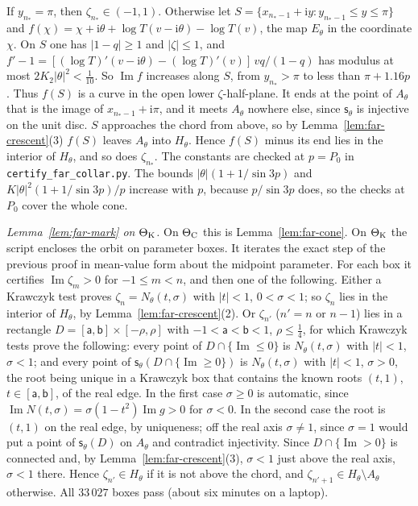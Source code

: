 \documentclass[11pt]{amsart}
\theoremstyle{definition}
\newcommand{\ii}{\mathrm{i}}
\begin{document}
If $y_{n_*}=\pi$, then $\zeta_{n_*}\in(-1,1)$.  Otherwise let
$S=\{x_{n_*-1}+\ii y:y_{n_*-1}\le y\le\pi\}$ and $f(\chi)=\chi+\ii\theta+\log T(v-\ii\theta)-\log T(v)$, the
map $E_\theta$ in the coordinate $\chi$.  On $S$ one has $|1-q|\ge1$ and $|\zeta|\le1$, and
$f'-1=[(\log T)'(v-\ii\theta)-(\log T)'(v)]\,vq/(1-q)$ has modulus at most $2K_2|\theta|^2<\tfrac1{10}$.  So
$\operatorname{Im}f$ increases along $S$, from $y_{n_*}>\pi$ to less than $\pi+1.16p$.  Thus $f(S)$ is a
curve in the open lower $\zeta$-half-plane.  It ends at the point of $A_\theta$ that is the image of
$x_{n_*-1}+\ii\pi$, and it meets $A_\theta$ nowhere else, since $\mathsf s_\theta$ is injective on the unit
disc.  $S$ approaches the chord from above, so by Lemma~\ref{lem:far-crescent}(3) $f(S)$
leaves $A_\theta$ into $H_\theta$.  Hence $f(S)$ minus its end lies in the interior of $H_\theta$, and so does
$\zeta_{n_*}$.  The constants are checked at $p=P_0$ in \texttt{certify\_far\_collar.py}.  The
bounds $|\theta|(1+1/\sin3p)$ and $K|\theta|^2(1+1/\sin3p)/p$ increase with $p$, because $p/\sin3p$ does, so
the checks at $P_0$ cover the whole cone.

\emph{Lemma~\ref{lem:far-mark} on $\Theta_{\rm K}$.}  On $\Theta_{\rm C}$ this is Lemma~\ref{lem:far-cone}.  On $\Theta_{\rm K}$ the script
encloses the orbit on parameter boxes.  It iterates the exact step of the
previous proof in mean-value form about the midpoint parameter.  For each box it
certifies $\operatorname{Im}\zeta_m>0$ for $-1\le m<n$, and then one of the following.  Either a
Krawczyk test proves $\zeta_n=N_\theta(t,\sigma)$ with $|t|<1$, $0<\sigma<1$; so $\zeta_n$ lies in the interior of
$H_\theta$, by Lemma~\ref{lem:far-crescent}(2).  Or $\zeta_{n'}$ ($n'=n$ or $n-1$) lies in a rectangle
$D=[\mathsf a,\mathsf b]\times[-\rho,\rho]$ with $-1<\mathsf a<\mathsf b<1$, $\rho\le\tfrac14$, for which Krawczyk tests prove the
following: every point of $D\cap\{\operatorname{Im}\le0\}$ is $N_\theta(t,\sigma)$ with $|t|<1$, $\sigma<1$; and
every point of $\mathsf s_\theta(D\cap\{\operatorname{Im}\ge0\})$ is $N_\theta(t,\sigma)$ with $|t|<1$, $\sigma>0$, the root being
unique in a Krawczyk box that contains the known roots $(t,1)$, $t\in[\mathsf a,\mathsf b]$, of
the real edge.  In the
first case $\sigma\ge0$ is automatic, since $\operatorname{Im}N(t,\sigma)=\sigma(1-t^2)\operatorname{Im}g>0$ for $\sigma<0$.  In the
second case the root is $(t,1)$ on the real edge, by uniqueness; off the real
axis $\sigma\ne1$, since $\sigma=1$ would put a point of $\mathsf s_\theta(D)$ on $A_\theta$ and contradict
injectivity.  Since $D\cap\{\operatorname{Im}>0\}$ is connected and, by
Lemma~\ref{lem:far-crescent}(3), $\sigma<1$ just above the real axis, $\sigma<1$ there.  Hence $\zeta_{n'}\in H_\theta$ if it is not above the chord, and
$\zeta_{n'+1}\in H_\theta\setminus A_\theta$ otherwise.  All $33\,027$ boxes pass (about six minutes on a laptop).
\end{document}
